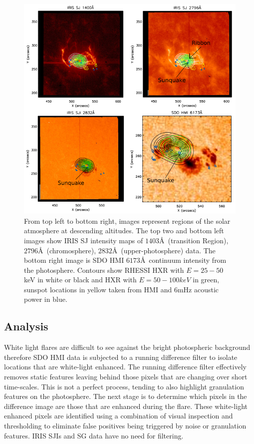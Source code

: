 \begin{figure}[H]
  \begin{center}
  \includegraphics[width=1.0\textwidth]{saxcontours-square}
  \end{center}
  \caption{From top left to bottom right, images represent regions of the solar atmosphere at descending altitudes. The top two and bottom left images show IRIS SJ intensity maps of $1403$\AA\ (transition Region), $2796$\AA\ (chromosphere), $2832$\AA\ (upper-photosphere) data. The bottom right image is SDO HMI $6173$\AA\ continuum intensity from the photosphere. Contours show RHESSI HXR with $E = 25-50$ keV in white or black and HXR with $E = 50-100 keV$ in green, sunspot locations in yellow taken from HMI and 6mHz acoustic power in blue.}\label{saxcontours-vert}
\end{figure}


\subsection{Analysis}


White light flares are difficult to see against the bright photospheric background therefore SDO HMI data is subjected to a running difference filter to isolate locations that are white-light enhanced. The running difference filter effectively removes static features leaving behind those pixels that are changing over short time-scales. This is not a perfect process, tending to also highlight granulation features on the photosphere. The next stage is to determine which pixels in the difference image are those that are enhanced during the flare.  These white-light enhanced pixels are identified using a combination of visual inspection and thresholding to eliminate false positives being triggered by noise or granulation features. IRIS SJIs and SG data have no need for filtering.


